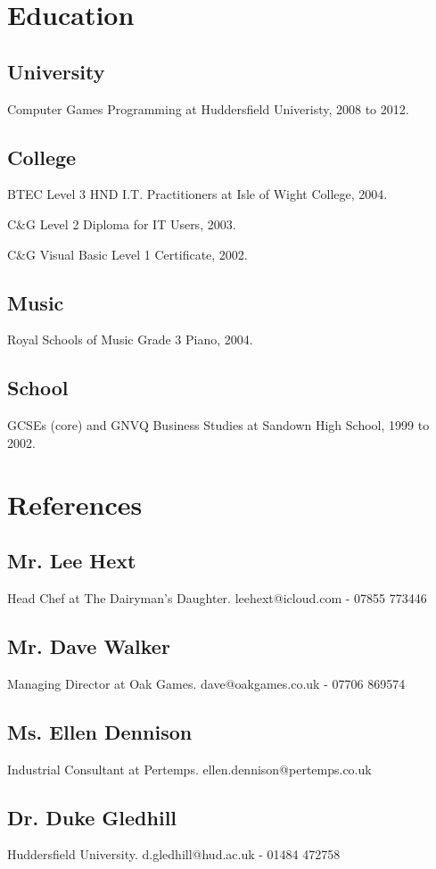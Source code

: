 \documentclass{article}
\begin{document}
\section{Education}
\subsection{University}
Computer Games Programming at Huddersfield Univeristy, 2008 to 2012.
\subsection{College}
BTEC Level 3 HND I.T. Practitioners at Isle of Wight College, 2004.

C\&G Level 2 Diploma for IT Users, 2003.

C\&G Visual Basic Level 1 Certificate, 2002.
\subsection{Music}
Royal Schools of Music Grade 3 Piano, 2004.
\subsection{School}
GCSEs (core) and GNVQ Business Studies at Sandown High School, 1999 to 2002.

\section{References}
\subsection{Mr. Lee Hext}
Head Chef at The Dairyman's Daughter.  leehext@icloud.com - 07855 773446
\subsection{Mr. Dave Walker}
Managing Director at Oak Games.  dave@oakgames.co.uk - 07706 869574
\subsection{Ms. Ellen Dennison}
Industrial Consultant at Pertemps.  ellen.dennison@pertemps.co.uk
\subsection{Dr. Duke Gledhill}
Huddersfield University.  d.gledhill@hud.ac.uk - 01484 472758
\end{document}
